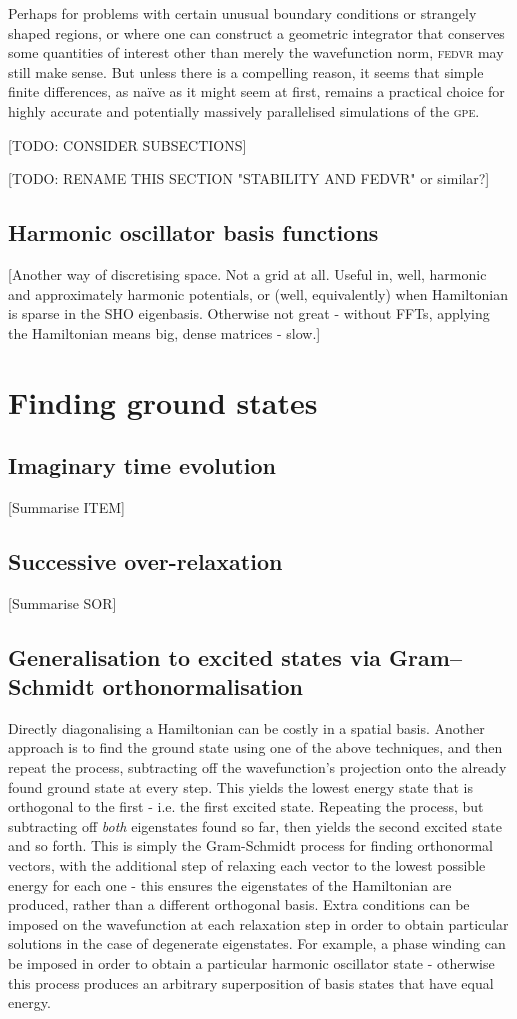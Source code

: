 Perhaps for problems with certain unusual boundary conditions or strangely shaped regions, or where one can construct a geometric integrator that conserves some quantities of interest other than merely the wavefunction norm, \textsc{fedvr} may still make sense. But unless there is a compelling reason, it seems that simple finite differences, as naïve as it might seem at first, remains a practical choice for highly accurate and potentially massively parallelised simulations of the \textsc{gpe}.

[TODO: CONSIDER SUBSECTIONS]

[TODO: RENAME THIS SECTION "STABILITY AND FEDVR" or similar?]

\subsection{Harmonic oscillator basis functions}

[Another way of discretising space. Not a grid at all. Useful in, well, harmonic and approximately harmonic potentials, or (well, equivalently) when Hamiltonian is sparse in the SHO eigenbasis. Otherwise not great - without FFTs, applying the Hamiltonian means big, dense matrices - slow.]

\section{Finding ground states}
\subsection{Imaginary time evolution}
[Summarise ITEM]
\subsection{Successive over-relaxation}
[Summarise SOR]
\subsection{Generalisation to excited states via Gram–Schmidt orthonormalisation}
Directly diagonalising a Hamiltonian can be costly in a spatial basis. Another approach is to find the ground state using one of the above techniques, and then repeat the process, subtracting off the wavefunction's projection onto the already found ground state at every step. This yields the lowest energy state that is orthogonal to the first - i.e. the first excited state. Repeating the process, but subtracting off \emph{both} eigenstates found so far, then yields the second excited state and so forth. This is simply the Gram-Schmidt process for finding orthonormal vectors, with the additional step of relaxing each vector to the lowest possible energy for each one - this ensures the eigenstates of the Hamiltonian are produced, rather than a different orthogonal basis. Extra conditions can be imposed on the wavefunction at each relaxation step in order to obtain particular solutions in the case of degenerate eigenstates. For example, a phase winding can be imposed in order to obtain a particular harmonic oscillator state - otherwise this process produces an arbitrary superposition of basis states that have equal energy.

